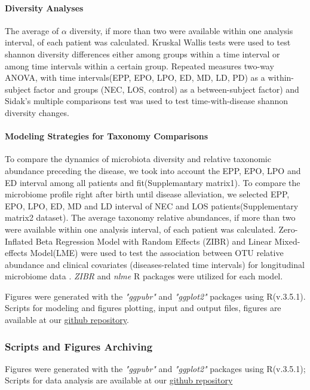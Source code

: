 \documentclass[fleqn,10pt, lineno]{wlpeerj} %
\begin{document}
      \paragraph{Diversity Analyses}
      The average of $\alpha$ diversity, if more than two were available within one analysis interval, of each patient was calculated. Kruskal Wallis tests were used to test shannon diversity differences either among groups within a time interval or among time intervals within a certain group. Repeated measures two-way ANOVA, with time intervals(EPP, EPO, LPO, ED, MD, LD, PD) as a within-subject factor and groups (NEC, LOS, control) as a between-subject factor) and Sidak's multiple comparisons test was used to test time-with-disease shannon diversity changes.
      \paragraph*{Modeling Strategies for Taxonomy Comparisons}
      To compare the dynamics of microbiota diversity and relative taxonomic abundance preceding the disease, we took into account the EPP, EPO, LPO and ED interval among all patients and fit(Supplemantary matrix1).
      To compare the microbiome profile right after birth until disease alleviation, we selected EPP, EPO, LPO, ED, MD and LD interval of NEC and LOS patients(Supplementary matrix2 dataset).
      The average taxonomy relative abundances, if more than two were available within one analysis interval, of each patient was calculated.
      Zero-Inflated Beta Regression Model with Random Effects (ZIBR) and Linear Mixed-effects Model(LME) were used to test the association between OTU relative abundance and clinical covariates (diseases-related time intervals) for longitudinal microbiome data \citep{chen2016two}. \textit{ZIBR} and \textit{nlme}\citep{nlme} R packages were utilized for each model.

      \noindent
      Figures were generated with the \textit{"ggpubr"}\citep{kassambara2017ggpubr} and \textit{"ggplot2"}\citep{ggplot2} packages using R(v.3.5.1).
      Scripts for modeling and figures plotting, input and output files, figures are available at our \href{https://github.com/jiayiliujiayi/NEC-LOS-microbiota_pattern_comparison}{github repository}.

    \subsubsection*{Scripts and Figures Archiving}
    Figures were generated with the \textit{"ggpubr"}\citep{kassambara2017ggpubr} and \textit{"ggplot2"}\citep{ggplot2} packages using R(v.3.5.1); Scripts for data analysis are available at our \href{https://github.com/jiayiliujiayi/NEC-LOS-microbiota_pattern_comparison}{github repository}
\end{document}
